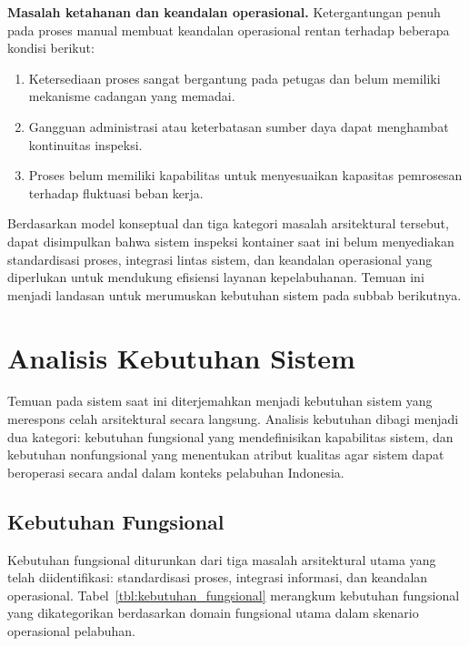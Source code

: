 \textbf{Masalah ketahanan dan keandalan operasional.}
Ketergantungan penuh pada proses manual membuat keandalan operasional rentan
terhadap beberapa kondisi berikut:

\begin{enumerate}
  \item Ketersediaan proses sangat bergantung pada petugas dan belum memiliki
  mekanisme cadangan yang memadai.
  \item Gangguan administrasi atau keterbatasan sumber daya dapat menghambat
  kontinuitas inspeksi.
  \item Proses belum memiliki kapabilitas untuk menyesuaikan kapasitas
  pemrosesan terhadap fluktuasi beban kerja.
\end{enumerate}

Berdasarkan model konseptual dan tiga kategori masalah arsitektural tersebut,
dapat disimpulkan bahwa sistem inspeksi kontainer saat ini belum menyediakan
standardisasi proses, integrasi lintas sistem, dan keandalan
operasional yang diperlukan untuk mendukung efisiensi layanan kepelabuhanan.
Temuan ini menjadi landasan untuk merumuskan kebutuhan sistem pada subbab
berikutnya.

\section{Analisis Kebutuhan Sistem}

Temuan pada sistem saat ini diterjemahkan menjadi kebutuhan sistem yang merespons celah arsitektural secara langsung. Analisis kebutuhan dibagi menjadi dua kategori: kebutuhan fungsional yang mendefinisikan kapabilitas sistem, dan kebutuhan nonfungsional yang menentukan atribut kualitas agar sistem dapat beroperasi secara andal dalam konteks pelabuhan Indonesia.

\subsection{Kebutuhan Fungsional}

Kebutuhan fungsional diturunkan dari tiga masalah arsitektural utama yang telah
diidentifikasi: standardisasi proses, integrasi informasi, dan keandalan
operasional. Tabel~\ref{tbl:kebutuhan_fungsional} merangkum kebutuhan
fungsional yang dikategorikan berdasarkan domain fungsional utama dalam
skenario operasional pelabuhan.

